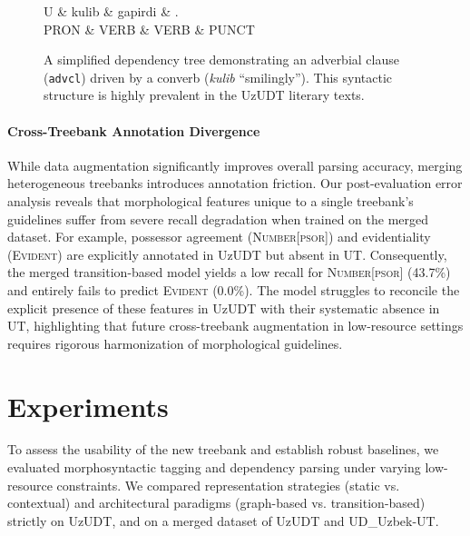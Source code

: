 \documentclass[10pt, a4paper]{article}
\begin{document}
\begin{figure}[ht]
\centering
\begin{dependency}[theme = default]
   \begin{deptext}[column sep=1.2em]
      U \& kulib \& gapirdi \& . \\
      PRON \& VERB \& VERB \& PUNCT \\
   \end{deptext}
\end{dependency}
\caption{A simplified dependency tree demonstrating an adverbial clause (\texttt{advcl}) driven by a converb (\textit{kulib} ``smilingly''). This syntactic structure is highly prevalent in the UzUDT literary texts.}
\label{fig:tikz_advcl}
\end{figure}
\paragraph{Cross-Treebank Annotation Divergence}
While data augmentation significantly improves overall parsing accuracy, merging heterogeneous treebanks introduces annotation friction. Our post-evaluation error analysis reveals that morphological features unique to a single treebank's guidelines suffer from severe recall degradation when trained on the merged dataset. For example, possessor agreement (\textsc{Number[psor]}) and evidentiality (\textsc{Evident}) are explicitly annotated in UzUDT but absent in UT. Consequently, the merged transition-based model yields a low recall for \textsc{Number[psor]} (43.7\%) and entirely fails to predict \textsc{Evident} (0.0\%). The model struggles to reconcile the explicit presence of these features in UzUDT with their systematic absence in UT, highlighting that future cross-treebank augmentation in low-resource settings requires rigorous harmonization of morphological guidelines.

\section{Experiments}
\label{sec:experiments}

To assess the usability of the new treebank and establish robust baselines, we evaluated morphosyntactic tagging and dependency parsing under varying low-resource constraints. We compared representation strategies (static vs. contextual) and architectural paradigms (graph-based vs. transition-based) strictly on UzUDT, and on a merged dataset of UzUDT and UD\_Uzbek-UT.
\end{document}
